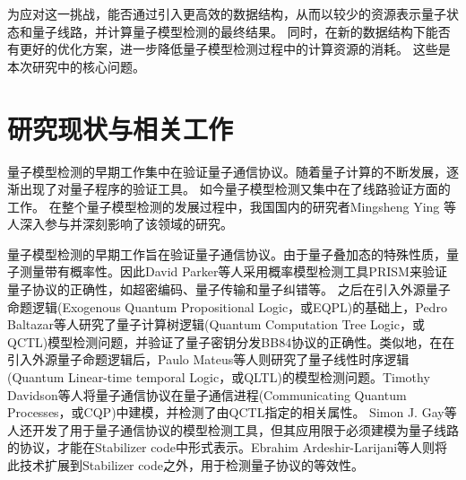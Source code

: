 为应对这一挑战，能否通过引入更高效的数据结构，从而以较少的资源表示量子状态和量子线路，并计算量子模型检测的最终结果。
同时，在新的数据结构下能否有更好的优化方案，进一步降低量子模型检测过程中的计算资源的消耗。
这些是本次研究中的核心问题。
\section{研究现状与相关工作}
量子模型检测的早期工作集中在验证量子通信协议。随着量子计算的不断发展，逐渐出现了对量子程序的验证工具。
如今量子模型检测又集中在了线路验证方面的工作。
在整个量子模型检测的发展过程中，我国国内的研究者Mingsheng Ying
等人深入参与并深刻影响了该领域的研究。

量子模型检测的早期工作旨在验证量子通信协议。由于量子叠加态的特殊性质，量子测量带有概率性。因此David Parker等人采用概率模型检测工具PRISM\citep{kwiatkowska2004probabilistic}来验证量子协议的正确性，如超密编码、量子传输和量子纠错等。
之后在引入外源量子命题逻辑(Exogenous Quantum Propositional Logic，或EQPL)\citep{mateus2006weakly}的基础上，Pedro Baltazar等人研究了量子计算树逻辑(Quantum Computation Tree Logic，或QCTL)模型检测问题，并验证了量子密钥分发BB84协议\citep{bennett2014quantum}的正确性\citep{baltazar2008quantum,baltazar2007towards}。类似地，在在引入外源量子命题逻辑后，Paulo Mateus等人则研究了量子线性时序逻辑(Quantum Linear-time temporal Logic，或QLTL)的模型检测问题\citep{mateus2009temporal}。Timothy Davidson等人将量子通信协议在量子通信进程(Communicating Quantum Processes，或CQP)\citep{gay2005communicating}中建模，并检测了由QCTL指定的相关属性\citep{davidson2012formal,davidson2012model}。
Simon J. Gay等人还开发了用于量子通信协议的模型检测工具\citep{Gay,gay2010specification}，但其应用限于必须建模为量子线路的协议，才能在Stabilizer code\citep{gottesman1997stabilizer}中形式表示。Ebrahim Ardeshir-Larijani等人则将此技术扩展到Stabilizer code之外，用于检测量子协议的等效性\citep{ardeshir2013equivalence,ardeshir2014verification}。

